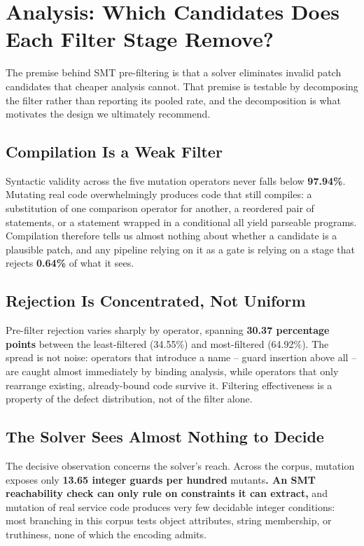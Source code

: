 \documentclass[10pt,journal,compsoc,twocolumn]{IEEEtran}
\begin{document}
\section{Analysis: Which Candidates Does Each Filter Stage Remove?}


The premise behind SMT pre-filtering is that a solver eliminates invalid patch
candidates that cheaper analysis cannot. That premise is testable by decomposing
the filter rather than reporting its pooled rate, and the decomposition is what
motivates the design we ultimately recommend.


\subsection{Compilation Is a Weak Filter}


Syntactic validity across the five mutation operators never falls below
\textbf{97.94\%}. Mutating real code overwhelmingly produces
code that still compiles: a substitution of one comparison operator for another, a
reordered pair of statements, or a statement wrapped in a conditional all yield
parseable programs. Compilation therefore tells us almost nothing about whether a
candidate is a plausible patch, and any pipeline relying on it as a gate is relying
on a stage that rejects
\textbf{0.64\%} of what it sees.


\subsection{Rejection Is Concentrated, Not Uniform}


Pre-filter rejection varies sharply by operator, spanning
\textbf{30.37 percentage points} between the
least-filtered (34.55\%) and most-filtered
(64.92\%). The spread is not noise: operators that
introduce a name -- guard insertion above all -- are caught almost immediately by
binding analysis, while operators that only rearrange existing, already-bound code
survive it. Filtering effectiveness is a property of the defect distribution, not
of the filter alone.


\subsection{The Solver Sees Almost Nothing to Decide}


The decisive observation concerns the solver's reach. Across the corpus, mutation
exposes only \textbf{13.65 integer guards per hundred}
mutants\textbf{. An SMT reachability check can only rule on constraints it can extract,}
and mutation of real service code produces very few decidable integer conditions:
most branching in this corpus tests object attributes, string membership, or
truthiness, none of which the encoding admits.
\end{document}
